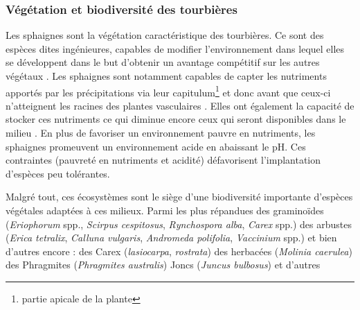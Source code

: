 %

\subsubsection{Végétation et biodiversité des tourbières}

Les sphaignes sont la végétation caractéristique des tourbières.
Ce sont des espèces dites ingénieures, capables de modifier l'environnement dans lequel elles se développent dans le but d'obtenir un avantage compétitif sur les autres végétaux \citep{vanbreemen1995}.
Les sphaignes sont notamment capables de capter les nutriments apportés par les précipitations via leur capitulum\footnote{partie apicale de la plante} et donc avant que ceux-ci n'atteignent les racines des plantes vasculaires \citep{malmer1994,svensson1995}.
Elles ont également la capacité de stocker ces nutriments ce qui diminue encore ceux qui seront disponibles dans le milieu \citep{rydin2013d}.
En plus de favoriser un environnement pauvre en nutriments, les sphaignes promeuvent un environnement acide en abaissant le pH.
Ces contraintes (pauvreté en nutriments et acidité) défavorisent l'implantation d'espèces peu tolérantes.

Malgré tout, ces écosystèmes sont le siège d'une biodiversité importante d'espèces végétales adaptées à ces milieux.
Parmi les plus répandues des graminoïdes (\textit{Eriophorum} spp., \textit{Scirpus cespitosus}, \textit{Rynchospora alba}, \textit{Carex} spp.) des arbustes (\textit{Erica tetralix}, \textit{Calluna vulgaris}, \textit{Andromeda polifolia}, \textit{Vaccinium} spp.) et bien d'autres encore 
 : des Carex (\textit{lasiocarpa}, \textit{rostrata}) des herbacées (\textit{Molinia caerulea}) des Phragmites (\textit{Phragmites australis}) Joncs (\textit{Juncus bulbosus}) et d'autres \citep{rydin2013dofip}

